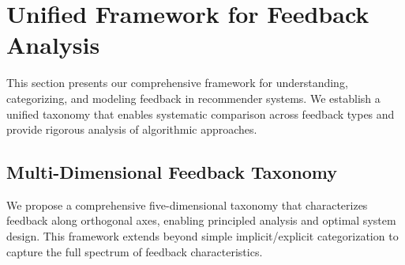 
\section{Unified Framework for Feedback Analysis}
\label{sec:methodology}

This section presents our comprehensive framework for understanding, categorizing, and modeling feedback in recommender systems. We establish a unified taxonomy that enables systematic comparison across feedback types and provide rigorous analysis of algorithmic approaches.

\subsection{Multi-Dimensional Feedback Taxonomy}
\label{subsec:taxonomy}

We propose a comprehensive five-dimensional taxonomy that characterizes feedback along orthogonal axes, enabling principled analysis and optimal system design. This framework extends beyond simple implicit/explicit categorization to capture the full spectrum of feedback characteristics.

